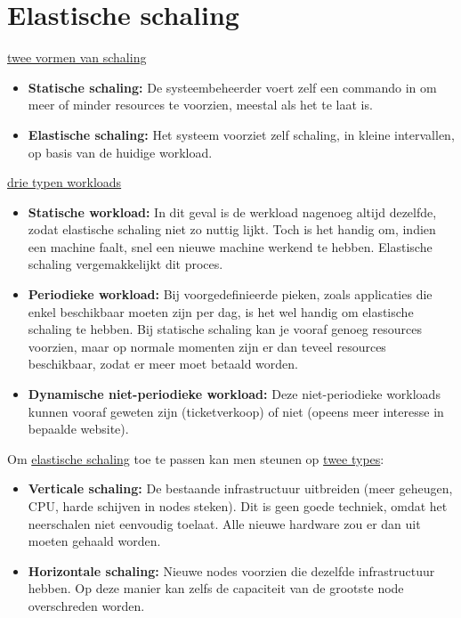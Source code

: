 \documentclass{report}
\begin{document}
	\section{Elastische schaling}
	\underline{twee vormen van schaling}
	\begin{itemize}
		\item[\info] \textbf{Statische schaling:} De systeembeheerder voert zelf een commando in om meer of minder resources te voorzien, meestal als het te laat is.
		\item[\info] \textbf{Elastische schaling:} Het systeem voorziet zelf schaling, in kleine intervallen, op basis van de huidige workload.
	\end{itemize}
	\underline{drie typen workloads}
	\begin{itemize}
		\item[\info] \textbf{Statische workload:} In dit geval is de werkload nagenoeg altijd dezelfde, zodat elastische schaling niet zo nuttig lijkt. Toch is het handig om, indien een machine faalt, snel een nieuwe machine werkend te hebben. Elastische schaling vergemakkelijkt dit proces. 
		\item[\info] \textbf{Periodieke workload:} Bij voorgedefinieerde pieken, zoals applicaties die enkel beschikbaar moeten zijn per dag, is het wel handig om elastische schaling te hebben. Bij statische schaling kan je vooraf genoeg resources voorzien, maar op normale momenten zijn er dan teveel resources beschikbaar, zodat er meer moet betaald worden.
		\item[\info] \textbf{Dynamische niet-periodieke workload:} Deze niet-periodieke workloads kunnen vooraf geweten zijn (ticketverkoop) of niet (opeens meer interesse in bepaalde website). 
	\end{itemize}

	Om \underline{elastische schaling} toe te passen kan men steunen op \underline{twee types}:
	\begin{itemize}
		\item[\alert] \textbf{Verticale schaling:} De bestaande infrastructuur uitbreiden (meer geheugen, CPU, harde schijven in nodes steken). Dit is geen goede techniek, omdat het neerschalen niet eenvoudig toelaat. Alle nieuwe hardware zou er dan uit moeten gehaald worden.
		\item[\good] \textbf{Horizontale schaling:} Nieuwe nodes voorzien die dezelfde infrastructuur hebben. Op deze manier kan zelfs de capaciteit van de grootste node overschreden worden.
	\end{itemize}
\end{document}
